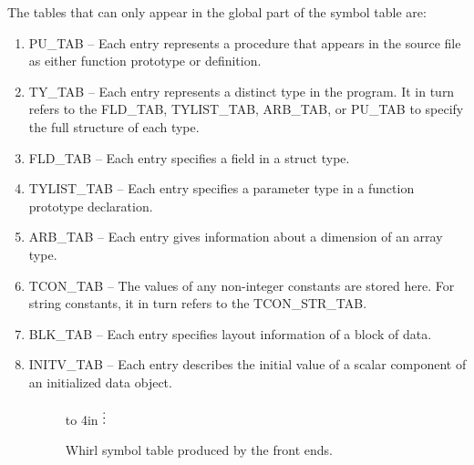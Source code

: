 \noindent The tables that can only appear in the global part of the symbol table are:

\begin{enumerate}
\item
{}%
PU\_TAB -- Each entry represents a procedure that appears in the
  source file as either function prototype or definition.

\item
{}%
TY\_TAB -- Each entry represents a distinct type in the
  program. It in turn refers to the FLD\_TAB, TYLIST\_TAB, ARB\_TAB,
or
%
PU\_TAB to specify the full structure of each type.

\item
{}%
FLD\_TAB -- Each entry specifies a field in a struct type.

\item
{}%
TYLIST\_TAB -- Each entry specifies a parameter type in a
  function prototype declaration.

\item
{}%
ARB\_TAB -- Each entry gives information about a dimension of an
  array type.

\item
{}%
TCON\_TAB -- The values of any non-integer constants are
  stored here. For string constants, it in turn refers to the
  TCON\_STR\_TAB.

\item
{}%
BLK\_TAB -- Each entry specifies layout information of a block
  of data.

\item
{}%
INITV\_TAB -- Each entry describes the initial value of a scalar
  component of an initialized data object.


\begin{figure}
\centering
\caption{Whirl symbol table produced by the front ends.}
\label{fig:symtabs}
\vbox to 4in{
\vfil
\vfil
{}
\vfil
\vbox{$\bf\vdots$}
\vfil
{}
}


\end{figure}
\end{enumerate}
